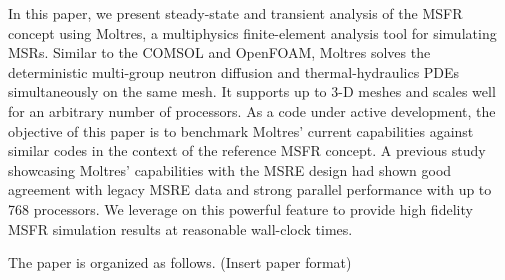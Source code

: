 In this paper, we present steady-state and transient analysis of the
\gls{MSFR} concept using Moltres, a multiphysics finite-element analysis tool
for simulating \glspl{MSR}. Similar to the COMSOL and OpenFOAM, Moltres
solves the deterministic multi-group neutron diffusion and thermal-hydraulics
\glspl{PDE} simultaneously on the same mesh. It supports up to 3-D meshes and
scales well for an arbitrary number of processors. As a code under active
development, the objective of this paper is to benchmark Moltres' current
capabilities against similar codes in the context of the reference
\gls{MSFR} concept. A previous study showcasing Moltres' capabilities with
the \gls{MSRE} design had shown good agreement with legacy
\gls{MSRE} data and strong parallel performance with up to 768 processors.
We leverage on this powerful feature to provide high fidelity \gls{MSFR}
simulation results at reasonable wall-clock times.

The paper is organized as follows. (Insert paper format)
